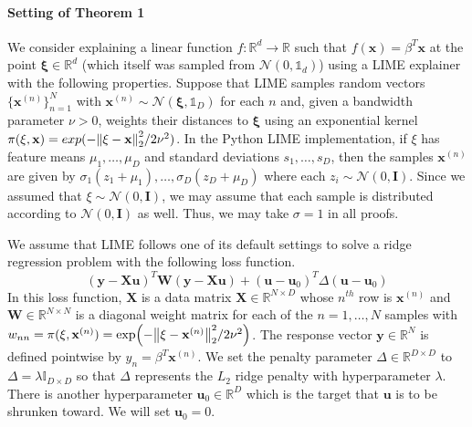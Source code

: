 \documentclass[mnsc,blindrev]{informs3}
\begin{document}
        \paragraph{Setting of Theorem 1}
            We consider explaining a linear function $f:\mathbb{R}^d \rightarrow \mathbb{R}$ such that $f(\mathbf{x}) = \beta^T \mathbf{x}$ at the point $\mathbf{\xi}\in \mathbb{R}^d$ (which itself was sampled from $\mathcal{N}(0, \mathds{1}_d)$) using a LIME explainer with the following properties. Suppose that LIME samples random vectors $\{\mathbf{x}^{(n)}\}_{n=1}^N$ with $\mathbf{x}^{(n)} \sim \mathcal{N}(\mathbf{\xi},\mathds{1}_D)$ for each $n$ and, given a bandwidth parameter $\nu > 0$, weights their distances to $\mathbf{\xi}$ using an exponential kernel $\pi(\xi,\mathbf{x}) = exp(-\norm{\mathbf{\xi} - \mathbf{x}}_2^2/2\nu^2)$. In the Python LIME implementation, if $\xi$ has feature means $\mu_1,\ldots,\mu_D$ and standard deviations $s_1,\ldots,s_D$, then the samples $\mathbf{x}^{(n)}$ are given by $\sigma_1(z_1 + \mu_1),\ldots,\sigma_D(z_D + \mu_D)$ where each $z_i\sim \mathcal{N}(0,\mathbf{I})$. Since we assumed that $\xi \sim \mathcal{N}(0,\mathbf{I})$, we may assume that each sample is distributed according to $\mathcal{N}(0,\mathbf{I})$ as well. Thus, we may take $\sigma = 1$ in all proofs. 
        
        We assume that LIME follows one of its default settings to solve a ridge regression problem with the following loss function.
        \begin{equation*}
            (\mathbf{y} - \mathbf{X}\mathbf{u})^T \mathbf{W}(\mathbf{y} - \mathbf{X}\mathbf{u}) + (\mathbf{u} - \mathbf{u}_0)^T \Delta(\mathbf{u} - \mathbf{u}_0)
        \end{equation*}
        In this loss function, $\mathbf{X}$ is a data matrix $\mathbf{X} \in \mathbb{R}^{N\times D}$ whose $n^{th}$ row is $\mathbf{x}^{(n)}$ and $\mathbf{W} \in \mathbb{R}^{N\times N}$ is a diagonal weight matrix for each of the $n=1,\ldots,N$ samples with $w_{nn} = \pi(\xi,\mathbf{x}^{(n)}) = \exp(-\norm{\xi - \mathbf{x}^{(n)}}_2^2/2\nu^2)$. The response vector $\mathbf{y}\in \mathbb{R}^N$ is defined pointwise by $y_n = \beta^T \mathbf{x}^{(n)}$. We set the penalty parameter $\Delta\in \mathbb{R}^{D\times D}$ to $\Delta = \lambda \mathds{I}_{D\times D}$ so that $\Delta$ represents the $L_2$ ridge penalty with hyperparameter $\lambda$. There is another hyperparameter $\mathbf{u}_0 \in \mathbb{R}^D$ which is the target that $\mathbf{u}$ is to be shrunken toward.  We will set $\mathbf{u}_0 = 0$.
\end{document}
